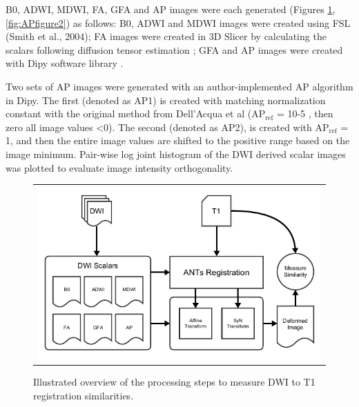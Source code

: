 B0, ADWI, MDWI, FA, GFA and AP images were each generated (Figures \ref{fig:APfigure1}, \ref{fig:APfigure2}) as follows: B0, ADWI and MDWI images were created using FSL (Smith et al., 2004); FA images were created in 3D Slicer by calculating the scalars following diffusion tensor estimation \cite{Pieper2006}; GFA and AP images were created with Dipy software library \cite{Descoteaux2007a,Garyfallidis2014}. 

Two sets of AP images were generated with an author-implemented AP algorithm in Dipy. The first (denoted as AP1) is created with matching normalization constant with the original method from Dell’Acqua et al \cite{DellAcqua2014} ($\text{AP}_{\text{ref}}$ = 10-5 , then zero all image values \textless 0). The second (denoted as AP2), is created with $\text{AP}_{\text{ref}}$ = 1, and then the entire image values are shifted to the positive range based on the image minimum. Pair-wise log joint histogram of the DWI derived scalar images was plotted \cite{Hunter2007} to evaluate image intensity orthogonality. 


\begin{figure}[ht]
\centering
\begin{tabular}{c}
    \includegraphics[width=0.8\linewidth]{figure1}
\end{tabular}
\caption{Illustrated overview of the processing steps to measure DWI to T1 registration similarities.}
\label{fig:APfigure1}
\end{figure}

